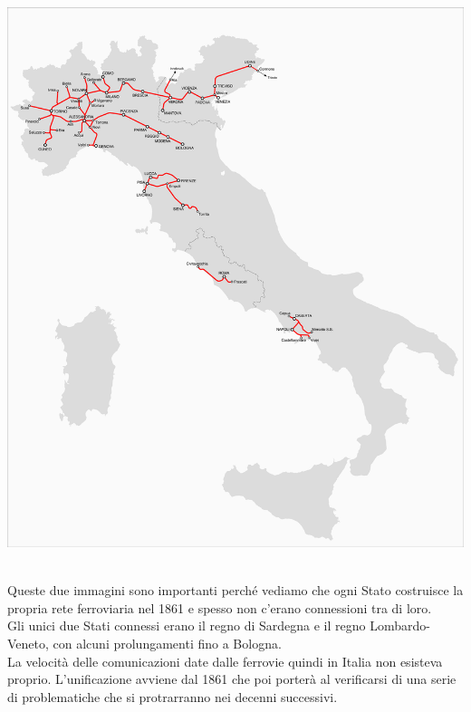 \documentclass[a4paper,12pt, oneside]{book}
\begin{document}
\begin{center}
\begin{minipage}{0.46\linewidth}
   		\includegraphics[width=\linewidth]{"Immagini/Italia_ferrovie_1861.03.17"}
   		\label{fig:Italia_ferrovie_1861.03.17}
   	\end{minipage}
   \end{center}
   \leavevmode\\
  Queste due immagini sono importanti perché vediamo che ogni Stato costruisce la propria rete ferroviaria nel 1861 e spesso non c'erano connessioni tra di loro.\\
  Gli unici due Stati connessi erano il regno di Sardegna e il regno Lombardo-Veneto, con alcuni prolungamenti fino a Bologna.\\
  La velocità delle comunicazioni date dalle ferrovie quindi in Italia non esisteva proprio. L'unificazione avviene dal 1861 che poi porterà al verificarsi di una serie di problematiche che si protrarranno nei decenni successivi.\\
\end{document}
